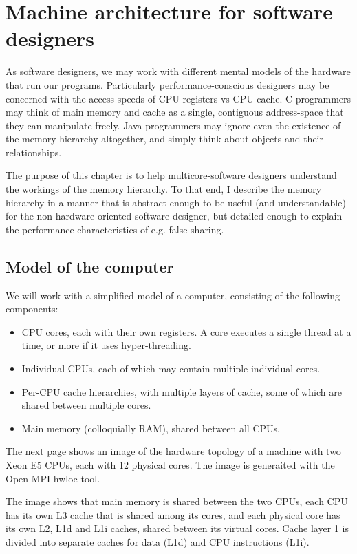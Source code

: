 \chapter{Machine architecture for software designers}
\label{chap:arch}
As software designers, we may work with different mental models of the hardware
that run our programs. Particularly performance-conscious designers may be
concerned with the access speeds of CPU registers vs CPU cache. C programmers
may think of main memory and cache as a single, contiguous address-space that
they can manipulate freely. Java programmers may ignore even
the existence of the memory hierarchy altogether, and simply think about objects
and their relationships.

The purpose of this chapter is to help multicore-software designers understand the
workings of the memory hierarchy. To that end, I describe the memory hierarchy
in a manner that is abstract enough to be useful (and understandable) for the
non-hardware oriented software designer, but detailed enough to explain the
performance characteristics of e.g. false sharing.

\section{Model of the computer}
We will work with a simplified model of a computer, consisting of the following
components:

\begin{itemize}
	\item CPU cores, each with their own registers. A core executes a single
		thread at a time, or more if it uses hyper-threading.
	\item Individual CPUs, each of which may contain multiple individual cores.
	\item Per-CPU cache hierarchies, with multiple layers of cache,
		some of which are shared between multiple cores.
	\item Main memory (colloquially RAM), shared between all CPUs.
\end{itemize}

The next page shows an image of the hardware topology of a machine with two Xeon E5 CPUs,
each with 12 physical cores. The image is generaited with the Open MPI hwloc
tool.



The image shows that main memory is shared between the two CPUs, each CPU has
its own L3 cache that is shared among its cores, and each physical core has its
own L2, L1d and L1i caches, shared between its virtual cores. Cache layer 1
is divided into separate caches for data (L1d) and CPU instructions (L1i).

